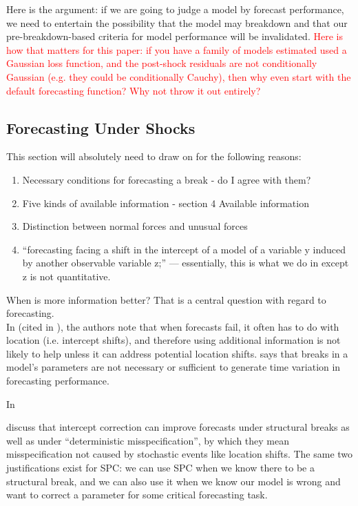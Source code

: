 \documentclass[11pt]{article}
\theoremstyle{definition}
\begin{document}
Here is the argument: if we are going to judge a model by forecast performance, we need to entertain the possibility that the model may breakdown and that our pre-breakdown-based criteria for model performance will be invalidated. \textcolor{red}{Here is how that matters for this paper: if you have a family of models estimated used a Gaussian loss function, and the post-shock residuals are not conditionally Gaussian (e.g. they could be conditionally Cauchy), then why even start with the default forecasting function?  Why not throw it out entirely?}


\subsection{Forecasting Under Shocks}

This section will absolutely need to draw on \cite{castle2011forecasting} for the following reasons:
\begin{enumerate}
  \item Necessary conditions for forecasting a break - do I agree with them?
  \item Five kinds of available information - section 4 Available information
  \item Distinction between normal forces and unusual forces 
  \item ``forecasting facing a shift in the intercept of a model of a variable y induced by another observable variable z;'' --- essentially, this is what we do in \cite{lundquist2024volatility} except z is not quantitative.
\end{enumerate}

When is more information better?  That is a central question with regard to forecasting.\\

In \cite{clements2005guest} (cited in \cite{castle2013forecasting}), the authors note that when forecasts fail, it often has to do with location (i.e. intercept shifts), and therefore using additional information is not likely to help unless it can address potential location shifts.  \cite{rossi2021forecasting} says that breaks in a model's parameters are not necessary or sufficient to generate time variation in forecasting performance.  

In \cite{castle2016overview}

\cite{hendry2004pooling} discuss that intercept correction can improve forecasts under structural breaks as well as under ``deterministic misspecification'', by which they mean misspecification not caused by stochastic events like location shifts.  The same two justifications exist for SPC: we can use SPC when we know there to be a structural break, and we can also use it when we know our model is wrong and want to correct a parameter for some critical forecasting task.
\end{document}
